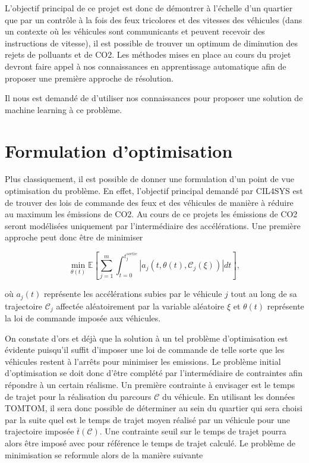 \documentclass[11pt]{article}
\begin{document}
L'objectif principal de ce projet est donc de démontrer à l’échelle d’un quartier que par un contrôle à la fois des feux tricolores et des vitesses des véhicules (dans un contexte où les véhicules sont communicants et peuvent recevoir des instructions de vitesse), il est possible de trouver un optimum de diminution des rejets de polluants et de CO2. Les méthodes mises en place au cours du projet devront faire appel à nos connaissances en apprentissage automatique afin de proposer une première approche de résolution.

Il nous est demandé de d'utiliser nos connaissances pour proposer une solution de machine learning à ce problème.

\section{Formulation d'optimisation}
\label{sec:orgd06fd0e}

Plus classiquement, il est possible de donner une formulation d'un point de vue optimisation du problème. En effet, l'objectif principal demandé par CIL4SYS est de trouver des lois de commande des feux et des véhicules de manière à réduire au maximum les émissions de CO2. Au cours de ce projets les émissions de CO2 seront modélisées uniquement par l'intermédiaire des accélérations. Une première approche peut donc être de minimiser

\begin{latex}
\begin{equation}
\min_{\theta(t)}{\mathbb{E}\left [\sum_{j=1}^{m} \int_{t = 0}^{t^{sortie}_{j}}{ | a_{j}(t,\theta(t),\mathcal{C}_{j}(\xi)) | dt} \right ]},
\end{equation}
\end{latex}

où \(a_{j}(t)\) représente les accélérations subies par le véhicule \(j\) tout au long de sa trajectoire \(\mathcal{C}_{j}\) affectée aléatoirement par la variable aléatoire \(\xi\) et \(\theta(t)\) représente la loi de commande imposée aux véhicules.

On constate d'ors et déjà que la solution à un tel problème d'optimisation est évidente puisqu'il suffit d'imposer une loi de commande de telle sorte que les véhicules restent à l'arrêts pour minimiser les emissions. Le problème initial d'optimisation se doit donc d'être complété par l'intermédiaire de contraintes afin répondre à un certain réalisme. Un première contrainte à envisager est le temps de trajet pour la réalisation du parcours \(\mathcal{C}\) du véhicule. En utilisant les données TOMTOM, il sera donc possible de déterminer au sein du quartier qui sera choisi par la suite quel est le temps de trajet moyen réalisé par un véhicule pour une trajectoire imposée \(\bar{t}(\mathcal{C})\). Une contrainte seuil sur le temps de trajet pourra alors être imposé avec pour référence le temps de trajet calculé. Le problème de minimisation se reformule alors de la manière suivante
\end{document}
